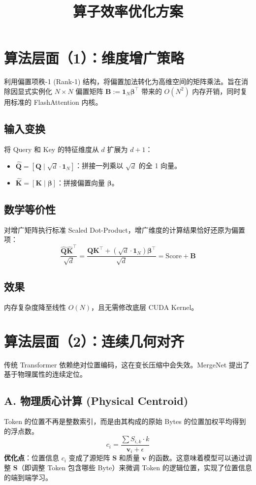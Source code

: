 \documentclass[a4paper,11pt]{article}
\title{\textbf{算子效率优化方案}}
\author{}
\date{}
\begin{document}
\maketitle

\section*{算法层面（1）：维度增广策略}

利用偏置项秩-1 (Rank-1) 结构，将偏置加法转化为高维空间的矩阵乘法。旨在消除因显式实例化 $N \times N$ 偏置矩阵 $\mathbf{B}:=\mathbf{1}_N\boldsymbol{\beta}^\top$ 带来的 $O(N^2)$ 内存开销，同时复用标准的 FlashAttention 内核。

\subsection*{输入变换}
将 Query 和 Key 的特征维度从 $d$ 扩展为 $d+1$：
\begin{itemize}
    \item $\hat{\mathbf{Q}} = [\mathbf{Q} \mid \sqrt{d} \cdot \mathbf{1}_N]$：拼接一列乘以 $\sqrt{d}$ 的全 1 向量。
    \item $\hat{\mathbf{K}} = [\mathbf{K} \mid \boldsymbol{\beta}]$：拼接偏置向量 $\boldsymbol{\beta}$。
\end{itemize}

\subsection*{数学等价性}
对增广矩阵执行标准 Scaled Dot-Product，增广维度的计算结果恰好还原为偏置项：
$$
\frac{\hat{\mathbf{Q}}\hat{\mathbf{K}}^\top}{\sqrt{d}} = \frac{\mathbf{Q}\mathbf{K}^\top + (\sqrt{d}\cdot\mathbf{1}_N)\boldsymbol{\beta}^\top}{\sqrt{d}} = \text{Score} + \mathbf{B}
$$

\subsection*{效果}
内存复杂度降至线性 $O(N)$，且无需修改底层 CUDA Kernel。

\section*{算法层面（2）：连续几何对齐}

传统 Transformer 依赖绝对位置编码，这在变长压缩中会失效。MergeNet 提出了基于物理属性的连续定位。

\subsection*{A. 物理质心计算 (Physical Centroid)}
Token 的位置不再是整数索引，而是由其构成的原始 Bytes 的位置加权平均得到的浮点数。
\begin{equation*}
    c_i = \frac{\sum S_{i,k} \cdot k}{\mathbf{v}_i + \epsilon}
\end{equation*}
\textbf{优化点}：位置信息 $c_i$ 变成了源矩阵 $\mathbf{S}$ 和质量 $\mathbf{v}$ 的函数。这意味着模型可以通过调整 $\mathbf{S}$（即调整 Token 包含哪些 Byte）来微调 Token 的逻辑位置，实现了位置信息的端到端学习。
\end{document}
